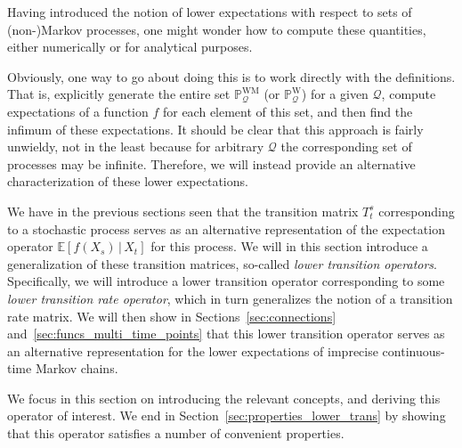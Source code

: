 \documentclass[10pt,a4paper]{paper}
\theoremstyle{definition}
\newcommand{\states}{\mathcal{X}}
\newcommand{\processes}{\mathbb{P}}
\newcommand{\wprocesses}{\processes^{\mathrm{W}}}
\newcommand{\wmprocesses}{\processes^{\mathrm{WM}}}
\newcommand{\gambles}{\mathcal{L}}
\newcommand{\gamblesX}{\gambles(\states)}
\newcommand{\rateset}{\mathcal{Q}}
\begin{document}
Having introduced the notion of lower expectations with respect to sets of (non-)Markov processes, one might wonder how to compute these quantities, either numerically or for analytical purposes. 

Obviously, one way to go about doing this is to work directly with the definitions. That is, explicitly generate the entire set $\wmprocesses_\rateset$ (or $\wprocesses_\rateset$) for a given $\rateset$, compute expectations of a function $f$ for each element of this set, and then find the infimum of these expectations. It should be clear that this approach is fairly unwieldy, not in the least because for arbitrary $\rateset$ the corresponding set of processes may be infinite. Therefore, we will instead provide an alternative characterization of these lower expectations.

We have in the previous sections seen that the transition matrix $T_t^s$ corresponding to a stochastic process serves as an alternative representation of the expectation operator $\mathbb{E}[f(X_s)\,\vert\,X_t]$ for this process. We will in this section introduce a generalization of these transition matrices, so-called \emph{lower transition operators}. Specifically, we will introduce a lower transition operator corresponding to some \emph{lower transition rate operator}, which in turn generalizes the notion of a transition rate matrix. We will then show in Sections~\ref{sec:connections} and~\ref{sec:funcs_multi_time_points} that this lower transition operator serves as an alternative representation for the lower expectations of imprecise continuous-time Markov chains.

We focus in this section on introducing the relevant concepts, and deriving this operator of interest. We end in Section~\ref{sec:properties_lower_trans} by showing that this operator satisfies a number of convenient properties.
\end{document}
